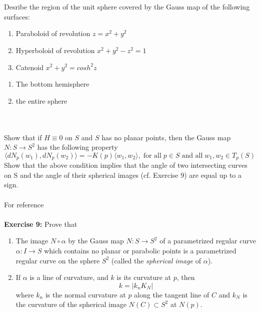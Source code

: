 \documentclass[12pt,letterpaper]{hmcpset}
\begin{document}
\newpage
\begin{problem}
\\ \\
Desribe the region of the unit sphere covered by the Gauss map of the following surfaces:  
\begin{enumerate}
    \item Paraboloid of revolution $z=x^2+y^2$
    \item Hyperboloid of revolution $x^2+y^2 -z^2 = 1$
    \item Catenoid $x^2+y^2 = cosh^2z$
\end{enumerate}
\end{problem}
\begin{solution}
  \begin{enumerate}
  \item The bottom hemisphere
  \item the entire sphere
  \end{enumerate}
\end{solution}

\newpage
\begin{problem}
\\ \\
Show that if $H\equiv 0$ on $S$ and $S$ has no planar points, then the Gauss map $N:S\to S^2$ has the following property
$$\langle dN_p(w_1), dN_p(w_2)\rangle = -K(p)\langle w_1,w_2\rangle,\; \text{for all}\;p\in S \; \text{and all}\; w_1,w_2\in T_p(S)$$  
Show that the above condition implies that the angle of two intersecting curves on S and the angle of their spherical images (cf. Exercise 9) are equal up to a sign.\\
\\ 
For reference\\ \\
\textbf{Exercise 9:} Prove that 
\begin{enumerate}
    \item The image $N\circ \alpha$ by the Gauss map $N:S\to S^2$ of a parametrized regular curve $\alpha :I\to S$ which contains no planar or parabolic points is a parametrized regular curve on the sphere $S^2$ (called the \textit{spherical image} of $\alpha$).
    \item If $\alpha$ is a line of curvature, and $k$ is its curvature at $p$, then 
    $$k = |k_nK_N|$$
    where $k_n$ is the normal curvature at $p$ along the tangent line of $C$ and $k_N$ is the curvature of the spherical image $N(C)\subset S^2$ at $N(p)$.  
\end{enumerate}


\end{problem}
\begin{solution}
\end{solution}
\end{document}
